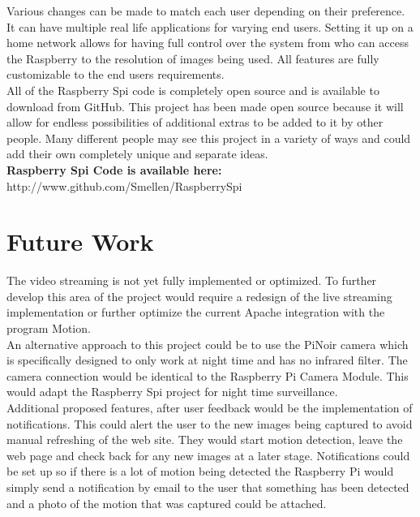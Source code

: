 \documentclass[12pt]{report}
\begin{document}
Various changes can be made to match each user depending on their preference. It can have multiple real life applications for varying end users. Setting it up on a home network allows for having full control over the system from who can access the Raspberry to the resolution of images being used. All features are fully customizable to the end users requirements.\\

All of the Raspberry Spi code is completely open source and is available to download from GitHub. This project has been made open source because it will allow for endless possibilities of additional extras to be added to it by other people. Many different people may see this project in a variety of ways and could add their own completely unique and separate ideas.\\

\noindent
{\bf Raspberry Spi Code is available here:\\}
{http://www.github.com/Smellen/RaspberrySpi}



\section{Future Work}
\label{sec:future}

The video streaming is not yet fully implemented or optimized. To further develop this area of the project would require a redesign of the live streaming implementation or further optimize the current Apache integration with the program Motion.\\

An alternative approach to this project could be to use the PiNoir camera which is specifically designed to only work at night time and has no infrared filter. The camera connection would be identical to the Raspberry Pi Camera Module. This would adapt the Raspberry Spi project for night time surveillance.\\

Additional proposed features, after user feedback would be the implementation of notifications. This could alert the user to the new images being captured to avoid manual refreshing of the web site. They would start motion detection, leave the web page and check back for any new images at a later stage. Notifications could be set up so if there is a lot of motion being detected the Raspberry Pi would simply send a notification by email to the user that something has been detected and a photo of the motion that was captured could be attached.
\end{document}
